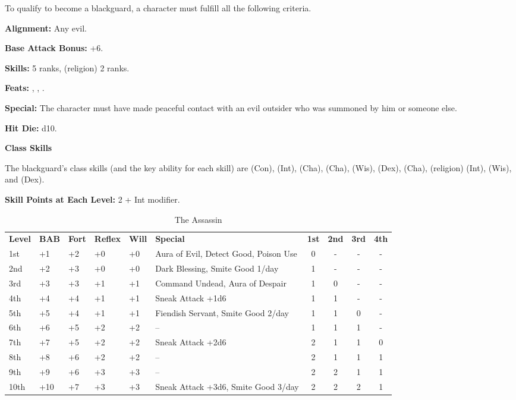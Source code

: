 
\Requirements

To qualify to become a blackguard, a character must fulfill all the following criteria.

\textbf{Alignment:} Any evil.

\textbf{Base Attack Bonus:} +6.

\textbf{Skills:}  5 ranks,  (religion) 2 ranks. 

\textbf{Feats:} , , .

\textbf{Special:} The character must have made peaceful contact with an evil outsider 
who was summoned by him or someone else.

\Basics

\textbf{Hit Die:} d10.

\textbf{Class Skills}

The blackguard's class skills (and the key ability for each skill) are  
(Con),  (Int),  (Cha),  (Cha),  (Wis),  (Dex), 
 (Cha),  (religion) (Int),  (Wis), and  (Dex). 

\textbf{Skill Points at Each Level:} 2 + Int modifier.

\begin{table}[htb]
\caption{The Assassin}
\centering
\begin{tabular}{*{6}{l}*{4}{c}}
\textbf{Level} & \textbf{BAB} & \textbf{Fort} & \textbf{Reflex} & \textbf{Will} & \textbf{Special} & \textbf{1st} & \textbf{2nd} & \textbf{3rd} & \textbf{4th} \\
1st & +1 & +2 & +0 & +0 & Aura of Evil, Detect Good, Poison Use & 0 & - & - & - \\
2nd & +2 & +3 & +0 & +0 & Dark Blessing, Smite Good 1/day & 1 & - & - & - \\
3rd & +3 & +3 & +1 & +1 & Command Undead, Aura of Despair & 1 & 0 & - & - \\
4th & +4 & +4 & +1 & +1 & Sneak Attack +1d6 & 1 & 1 & - & - \\
5th & +5 & +4 & +1 & +1 & Fiendish Servant, Smite Good 2/day & 1 & 1 & 0 & - \\
6th & +6 & +5 & +2 & +2 & -- & 1 & 1 & 1 & - \\
7th & +7 & +5 & +2 & +2 & Sneak Attack +2d6 & 2 & 1 & 1 & 0 \\
8th & +8 & +6 & +2 & +2 & -- & 2 & 1 & 1 & 1 \\
9th & +9 & +6 & +3 & +3 & -- & 2 & 2 & 1 & 1 \\
10th & +10 & +7 & +3 & +3 & Sneak Attack +3d6, Smite Good 3/day & 2 & 2 & 2 & 1 \\
\end{tabular}
\end{table}

